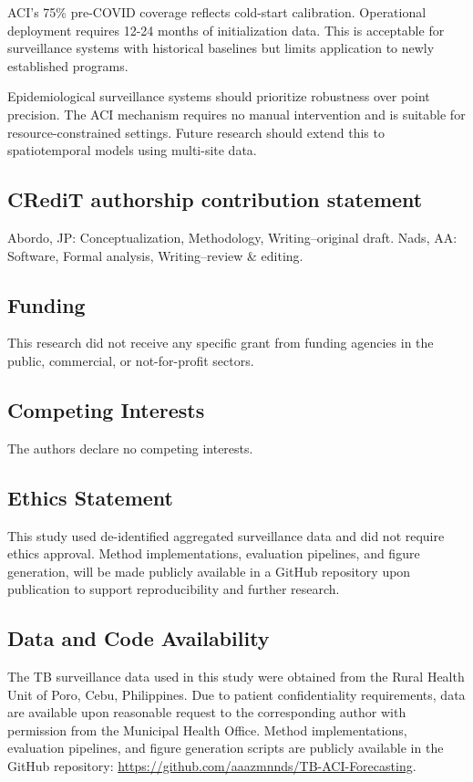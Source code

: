 \documentclass[final,3p,times,twocolumn,authoryear]{elsarticle}
\begin{document}
ACI's 75\% pre-COVID coverage reflects cold-start calibration. Operational deployment requires 12-24 months of initialization data. This is acceptable for surveillance systems with historical baselines but limits application to newly established programs.

Epidemiological surveillance systems should prioritize robustness over point precision. The ACI mechanism requires no manual intervention and is suitable for resource-constrained settings. Future research should extend this to spatiotemporal models using multi-site data.

\subsection*{CRediT authorship contribution statement}
Abordo, JP: Conceptualization, Methodology, Writing--original draft. Nads, AA: Software, Formal analysis, Writing--review \& editing.

\subsection*{Funding}
This research did not receive any specific grant from funding agencies in the public, commercial, or not-for-profit sectors.

\subsection*{Competing Interests}
The authors declare no competing interests.

\subsection*{Ethics Statement}
This study used de-identified aggregated surveillance data and did not require ethics approval. Method implementations, evaluation pipelines, and figure generation, will be made publicly available in a GitHub repository upon publication to support reproducibility and further research.

\subsection*{Data and Code Availability}
The TB surveillance data used in this study were obtained from the Rural Health Unit of Poro, Cebu, Philippines. Due to patient confidentiality requirements, data are available upon reasonable request to the corresponding author with permission from the Municipal Health Office. Method implementations, evaluation pipelines, and figure generation scripts are publicly available in the GitHub repository: \url{https://github.com/aaazmnnds/TB-ACI-Forecasting}.
\end{document}
